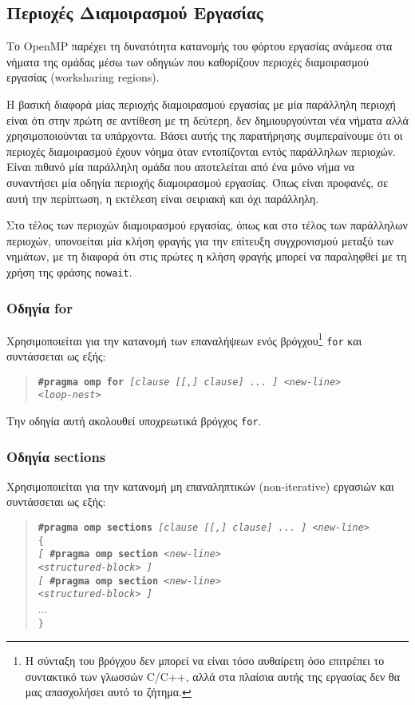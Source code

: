 \subsection{Περιοχές Διαμοιρασμού Εργασίας}
Το OpenMP παρέχει τη δυνατότητα κατανομής του φόρτου εργασίας ανάμεσα στα νήματα της ομάδας μέσω των οδηγιών που καθορίζουν περιοχές διαμοιρασμού εργασίας (worksharing regions).

Η βασική διαφορά μίας περιοχής διαμοιρασμού εργασίας με μία παράλληλη περιοχή είναι ότι στην πρώτη σε αντίθεση με τη δεύτερη, δεν δημιουργούνται νέα νήματα αλλά χρησιμοποιούνται τα υπάρχοντα. Βάσει αυτής της παρατήρησης συμπεραίνουμε ότι οι περιοχές διαμοιρασμού έχουν νόημα όταν εντοπίζονται εντός παράλληλων περιοχών. Είναι πιθανό μία παράλληλη ομάδα που αποτελείται από ένα μόνο νήμα να συναντήσει μία οδηγία περιοχής διαμοιρασμού εργασίας. Όπως είναι προφανές, σε αυτή την περίπτωση, η εκτέλεση είναι σειριακή και όχι παράλληλη.

Στο τέλος των περιοχών διαμοιρασμού εργασίας, όπως και στο τέλος των παράλληλων περιοχών, υπονοείται μία κλήση φραγής για την επίτευξη συγχρονισμού μεταξύ των νημάτων, με τη διαφορά ότι στις πρώτες η κλήση φραγής μπορεί να παραληφθεί με τη χρήση της φράσης \texttt{nowait}.

\subsubsection{Οδηγία for}
Χρησιμοποιείται για την κατανομή των επαναλήψεων ενός βρόγχου\footnote{Η σύνταξη του βρόγχου δεν μπορεί να είναι τόσο αυθαίρετη όσο επιτρέπει το συντακτικό των γλωσσών C/C++, αλλά στα πλαίσια αυτής της εργασίας δεν θα μας απασχολήσει αυτό το ζήτημα.} \texttt{for} και συντάσσεται ως εξής:
\begin{quote}
	\texttt{\textbf{\#pragma omp for} \textit{[clause [[,] clause] ... ] <new-line>}} \\
		\texttt{\textit{<loop-nest>}}
\end{quote}

Την οδηγία αυτή ακολουθεί υποχρεωτικά βρόγχος \texttt{for}.

\subsubsection{Οδηγία sections}
Χρησιμοποιείται για την κατανομή μη επαναληπτικών (non-iterative) εργασιών και συντάσσεται ως εξής:
\begin{quote}
	\texttt{\textbf{\#pragma omp sections} \textit{[clause [[,] clause] ... ] <new-line>}} \\
	\texttt{\{} \\
		\texttt{\textit{[} \textbf{\#pragma omp section} \textit{<new-line>}} \\
		\texttt{\textit{<structured-block> ]}} \\
		\texttt{\textit{[} \textbf{\#pragma omp section} \textit{<new-line>}} \\
		\texttt{\textit{<structured-block> ]}} \\
		... \\
	\texttt{\}}
\end{quote}

